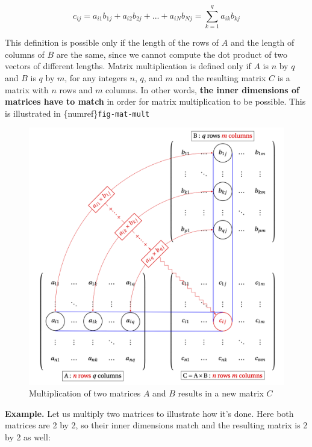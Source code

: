 \documentclass[
  letterpaper,
  DIV=11,
  numbers=noendperiod]{scrreprt}
\begin{document}
\[
c_{ij} = a_{i1}b_{1j} + a_{i2}b_{2j} + ... + a_{iN}b_{Nj} = \sum_{k=1}^q a_{ik} b_{kj}
\]

This definition is possible only if the length of the rows of \(A\) and
the length of columns of \(B\) are the same, since we cannot compute the
dot product of two vectors of different lengths. Matrix multiplication
is defined only if \(A\) is \(n\) by \(q\) and \(B\) is \(q\) by \(m\),
for any integers \(n\), \(q\), and \(m\) and the resulting matrix \(C\)
is a matrix with \(n\) rows and \(m\) columns. In other words,
\textbf{the inner dimensions of matrices have to match} in order for
matrix multiplication to be possible. This is illustrated in
\{numref\}\texttt{fig-mat-mult}

\begin{figure}

{\centering \includegraphics{./images/matrix_multiplication_tikz.png}

}

\caption{Multiplication of two matrices \(A\) and \(B\) results in a new
matrix \(C\)}

\end{figure}

\textbf{Example.} Let us multiply two matrices to illustrate how it's
done. Here both matrices are 2 by 2, so their inner dimensions match and
the resulting matrix is 2 by 2 as well:
\end{document}
